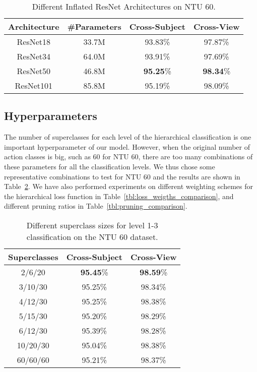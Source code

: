 \documentclass{article}
\begin{document}
\begin{table}
\begin{center}
\caption{Different Inflated ResNet Architectures on NTU 60.}
\label{tbl:Inflated_architecture_comparison}
\begin{tabular}{|c|c|c|c|}
\hline
Architecture & \#Parameters& Cross-Subject & Cross-View\\
\hline
ResNet18 & 33.7M & 93.83\% & 97.87\%\\
ResNet34 & 64.0M & 93.91\% & 97.69\%\\
ResNet50 & 46.8M & \textbf{95.25}\% & \textbf{98.34}\%\\
ResNet101 & 85.8M & 95.19\% & 98.09\%\\
\hline

\end{tabular}
\end{center}
\end{table}

\subsection{Hyperparameters}
\label{sec:hyperparameters}
{The number of superclasses for each level of the hierarchical classification is one important hyperparameter of our model. However, when the original number of action classes is big, such as 60 for NTU 60, there are too many combinations of these parameters for all the classification levels. We thus chose some representative combinations to test for NTU 60 and the results are shown in Table~\ref{tbl:super_class_comparison}. We have also performed experiments on different weighting schemes for the hierarchical loss function in Table~\ref{tbl:loss_weigths_comparison}, and different pruning ratios in Table~\ref{tbl:pruning_comparison}.}


\begin{table}
\begin{center}
\caption{Different superclass sizes for level 1-3 classification on the NTU 60 dataset.}
\label{tbl:super_class_comparison}
\begin{tabular}{|c|c|c|}
\hline
Superclasses & Cross-Subject & Cross-View\\
\hline
2/6/20 & \textbf{95.45}\% & \textbf{98.59}\% \\
3/10/30 & 95.25\% & 98.34\%\\
4/12/30 & 95.25\% & 98.38\%\\
5/15/30 & 95.20\% & 98.29\%\\
6/12/30 & 95.39\% & 98.28\%\\
10/20/30 & 95.04\% & 98.38\%\\
60/60/60 & 95.21\% & 98.37\%\\
\hline

\end{tabular}
\end{center}
\end{table}
\end{document}
